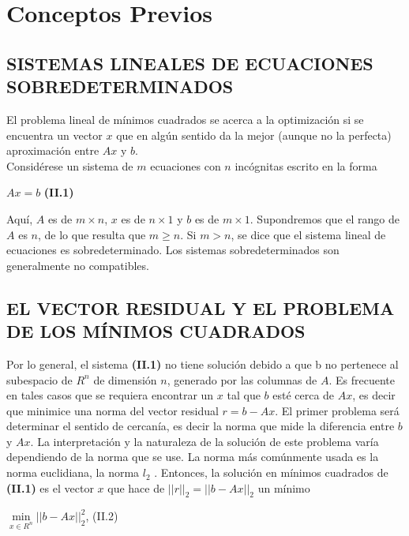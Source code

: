 \documentclass[twocolumn,twoside]{article}
\begin{document}
\section{Conceptos Previos}
\subsection{SISTEMAS LINEALES DE ECUACIONES SOBREDETERMINADOS}
\boldmath
El problema lineal de m\'inimos cuadrados se acerca a la optimizaci\'on
si se encuentra un vector $x$ que en alg\'un sentido da la mejor (aunque no la perfecta)
aproximaci\'on entre  $Ax$ y $b$.\\
Consid\'erese un sistema de $m$ ecuaciones con $n$ inc\'ognitas escrito en la forma 
\begin{center}
 $Ax=b$ \hspace{3cm}     \textbf{(II.1)}
\end{center}
Aqu\'i, $A$ es de $m\times n$, $x$ es de $n\times 1$ y $b$ es de $m\times 1$. Supondremos que el rango de $A$ es
$n$, de lo que resulta que $m\geq n$. Si $m> n$, se dice que el sistema lineal de ecuaciones es
sobredeterminado. Los sistemas sobredeterminados son generalmente no compatibles.

\subsection{EL VECTOR RESIDUAL Y EL PROBLEMA DE LOS M\'INIMOS CUADRADOS}

Por lo general, el sistema \textbf{(II.1)} no tiene soluci\'on debido a que b no pertenece al
subespacio de $R^n$ de dimensi\'on $n$, generado por las columnas de $A$. Es frecuente en tales
casos que se requiera encontrar un $x$ tal que $b$ est\'e cerca de $A x$, es decir que minimice
una norma del vector residual $r = b-A x$. El primer problema ser\'a determinar el sentido
de cercan\'ia, es decir la norma que mide la diferencia entre $b$ y $A x$. La interpretaci\'on
y la naturaleza de la soluci\'on de este problema var\'ia dependiendo de la norma que se
use. La norma m\'as com\'unmente usada es la norma euclidiana, la norma $l_2$ . Entonces, la
soluci\'on en m\'inimos cuadrados de \textbf{(II.1)} es el vector $x$ que hace de $||r||_2 = ||b - A x||_2$
un m\'inimo
\begin{center}
  $\min\limits_{x\in R^n}||b - A x||_2^2$, \hspace{2.5cm} (II.2)
\end{center}
\end{document}
